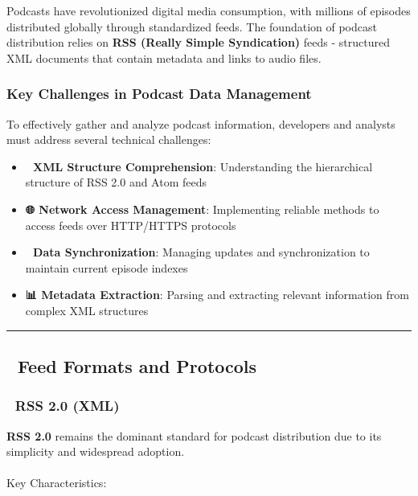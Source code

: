 \documentclass[
  letterpaper,
  DIV=11,
  numbers=noendperiod]{scrartcl}
\makeatletter
\let\oldparagraph\paragraph
\renewcommand{\paragraph}{
    \@ifstar
      \xxxParagraphStar
      \xxxParagraphNoStar
  }
\newcommand{\xxxParagraphStar}[1]{\oldparagraph*{#1}\mbox{}}
\newcommand{\xxxParagraphNoStar}[1]{\oldparagraph{#1}\mbox{}}
\providecommand{\tightlist}{%
  \setlength{\itemsep}{0pt}\setlength{\parskip}{0pt}}\usepackage{longtable,booktabs,array}
\makeatother
\begin{document}
Podcasts have revolutionized digital media consumption, with millions of
episodes distributed globally through standardized feeds. The foundation
of podcast distribution relies on \textbf{RSS (Really Simple
Syndication)} feeds - structured XML documents that contain metadata and
links to audio files.

\subsubsection{Key Challenges in Podcast Data
Management}\label{key-challenges-in-podcast-data-management}

To effectively gather and analyze podcast information, developers and
analysts must address several technical challenges:

\begin{itemize}
\tightlist
\item
  \textbf{📖 XML Structure Comprehension}: Understanding the
  hierarchical structure of RSS 2.0 and Atom feeds
\item
  \textbf{🌐 Network Access Management}: Implementing reliable methods
  to access feeds over HTTP/HTTPS protocols
\item
  \textbf{🔄 Data Synchronization}: Managing updates and synchronization
  to maintain current episode indexes
\item
  \textbf{📊 Metadata Extraction}: Parsing and extracting relevant
  information from complex XML structures
\end{itemize}

\begin{center}\rule{0.5\linewidth}{0.5pt}\end{center}

\subsection{📁 Feed Formats and
Protocols}\label{feed-formats-and-protocols}

\subsubsection{📰 RSS 2.0 (XML)}\label{rss-2.0-xml}

\textbf{RSS 2.0} remains the dominant standard for podcast distribution
due to its simplicity and widespread adoption.

\paragraph{Key Characteristics:}\label{key-characteristics}
\end{document}
